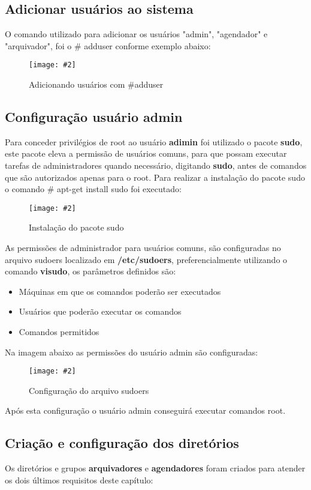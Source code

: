 \documentclass[
	12pt,				%
	openany,			%
	a4paper,			%
	chapter=TITLE,		%
	section=TITLE,		%
	english,
	brazil				%
]{abntex2}
\newcommand{\includeImage}[3] {

\begin{figure}[H]
 	 \centering
  		\texttt{[image: \#2]}
  	\caption{#3}
\end{figure}

}
\begin{document}
\subsection {Adicionar usuários ao sistema}
O comando utilizado para adicionar os usuários "admin", "agendador" e "arquivador", foi o \# adduser conforme exemplo abaixo:

\includeImage{0.7}{imgs/5_gerenciamento_grupos/adduser_exemplo.png}{Adicionando usuários com \#adduser}


\subsection{Configuração usuário admin}
Para conceder privilégios de root ao usuário \textbf{adimin} foi utilizado o pacote \textbf{sudo}, este pacote eleva a permissão de usuários comuns, para que possam executar tarefas de administradores quando necessário, digitando \textbf{sudo}, antes de comandos que são autorizados apenas para o root. Para realizar a instalação do pacote sudo o comando \# apt-get install sudo foi executado:

\includeImage{0.7}{imgs/5_gerenciamento_grupos/instalando_sudo.png}{Instalação do pacote sudo}

As permissões de administrador para usuários comuns, são configuradas no arquivo sudoers localizado em \textbf{/etc/sudoers}, preferencialmente utilizando o comando \textbf{visudo}, os parâmetros definidos são:

\begin{itemize}
	\item Máquinas em que os comandos poderão ser executados
	\item Usuários que poderão executar os comandos
	\item Comandos permitidos
\end{itemize}

Na imagem abaixo as permissões do usuário admin são configuradas:

\includeImage{0.7}{imgs/5_gerenciamento_grupos/adicionando_permissoes_de_root_para_usuario_admin.png}{Configuração do arquivo sudoers}

Após esta configuração o usuário admin conseguirá executar comandos root.

\subsection{Criação e configuração dos diretórios}

Os diretórios e grupos \textbf{arquivadores} e \textbf{agendadores} foram criados para atender os dois últimos requisitos deste capítulo:
\end{document}

